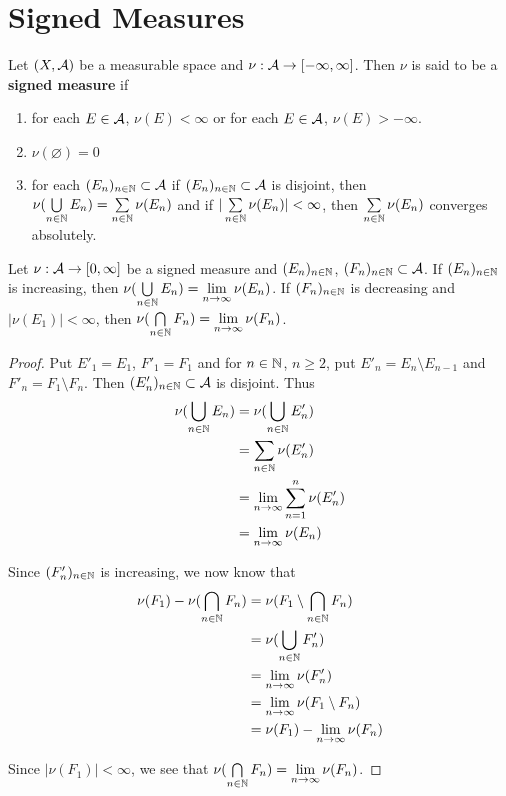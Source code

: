 \documentclass{book}
\begin{document}
	
	
	
	
	
	
	
	
	
	\newpage
	\section{Signed Measures}
	
	\begin{defn}  
		Let $(X, \mathcal{A})$ be a measurable space and $\nu : \mathcal{A} \rightarrow [-\infty, \infty]$. Then $\nu$ is said to be a \textbf{signed measure} if 
		\begin{enumerate}
			\item for each $E \in \mathcal{A}$, $\nu(E) < \infty$ or for each $E \in \mathcal{A}$, $\nu(E) > -\infty$.
			\item $\nu(\varnothing) = 0$
			\item for each $(E_n)_{n \in \mathbb{N}} \subset \mathcal{A}$ if $(E_n)_{n \in \mathbb{N}} \subset \mathcal{A}$ is disjoint, then $\nu(\bigcup\limits_{n \in \mathbb{N}} E_n) = \sum\limits_{n \in \mathbb{N}} \nu(E_n)$ and if $|\sum\limits_{n \in \mathbb{N}} \nu(E_n)| < \infty$, then $\sum\limits_{n \in \mathbb{N}} \nu(E_n)$ converges absolutely.
		\end{enumerate}
	\end{defn}
	
	\begin{ex}  
		Let $\nu: \mathcal{A} \rightarrow [0,\infty]$ be a signed measure and $(E_n)_{n \in \mathbb{N}}$, $(F_n)_{n \in \mathbb{N}} \subset \mathcal{A}$. If $(E_n)_{n \in \mathbb{N}}$ is increasing, then $\nu(\bigcup\limits_{n \in \mathbb{N}} E_n) = \lim \limits_{n \rightarrow \infty} \nu(E_n)$. If $(F_n)_{n \in \mathbb{N}}$ is decreasing and $|\nu(E_1)| < \infty$, then $\nu(\bigcap\limits_{n \in \mathbb{N}} F_n) = \lim \limits_{n \rightarrow \infty} \nu(F_n)$. 
	\end{ex}
	
	\begin{proof}
		Put $E'_1 = E_1$, $F'_1 = F_1$ and for $n \in \mathbb{N}$, $n \geq 2$, put $E'_n = E_n \setminus E_{n-1}$ and $F'_n = F_1 \setminus F_n$. Then $(E'_n)_{n \in \mathbb{N}} \subset \mathcal{A}$ is disjoint. Thus 
		\begin{align*}
			\nu(\bigcup\limits_{n \in \mathbb{N}} E_n) 
			&= \nu(\bigcup\limits_{n \in \mathbb{N}} E'_n)\\
			&= \sum\limits_{n \in \mathbb{N}} \nu(E'_n)\\
			&= \lim \limits_{n \rightarrow \infty} \sum_{n=1}^n \nu(E'_n)\\
			&= \lim \limits_{n \rightarrow \infty} \nu(E_n)
		\end{align*}
		
		Since $(F'_n)_{n \in \mathbb{N}}$ is increasing, we now know that 
		\begin{align*}
			\nu(F_1) - \nu(\bigcap\limits_{n \in \mathbb{N}} F_n)
			&= \nu(F_1 \setminus \bigcap\limits_{n \in \mathbb{N}} F_n)\\
			&= \nu(\bigcup\limits_{n \in \mathbb{N}} F'_n) \\
			&= \lim \limits_{n \rightarrow \infty} \nu(F'_n) \\
			&= \lim \limits_{n \rightarrow \infty} \nu(F_1 \setminus F_n) \\ 
			&= \nu(F_1) - \lim \limits_{n \rightarrow \infty} \nu(F_n)
		\end{align*}
		
		Since $|\nu(F_1)| < \infty$, we see that $\nu(\bigcap\limits_{n \in \mathbb{N}} F_n) = \lim \limits_{n \rightarrow \infty} \nu(F_n)$.
	\end{proof}
	
\end{document}
